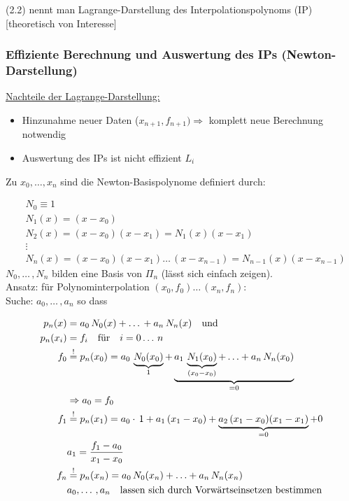 
(2.2) nennt man Lagrange-Darstellung des Interpolationspolynoms (IP) [theoretisch von Interesse]

\subsubsection{Effiziente Berechnung und Auswertung des IPs (Newton-Darstellung)}
\underline{Nachteile der Lagrange-Darstellung:}

\begin{itemize}
	\item Hinzunahme neuer Daten ($x_{n+1},f_{n+1}) \Rightarrow$ komplett neue Berechnung notwendig
	\item Auswertung des IPs ist nicht effizient $L_i$
\end{itemize}

Zu $x_0,\ldots,x_n$ sind die Newton-Basispolynome definiert durch:

\begin{align*}
&N_0 \equiv 1\\
&N_1(x) = (x-x_0)\\
&N_2(x) = (x-x_0)(x-x_1)=N_1(x)(x-x_1)\\
&\vdots \\
&N_n(x) = (x-x_0)(x-x_1)\ldots\,(x-x_{n-1})=N_{n-1}(x)(x-x_{n-1})
\end{align*}
$N_0,\ldots\,,N_n$ bilden eine Basis von $\Pi_n$ (lässt sich einfach zeigen).\\
Ansatz: für Polynominterpolation $(x_0,f_0)\ldots\,(x_n,f_n)$:\\
Suche: $a_0,\ldots\,,a_n$ so dass 

\begin{align*}
p_n(x)&=a_0\,N_0(x) + \ldots\, + a_n\,N_n(x) \quad \text{und} \\
p_n(x_i)&= f_i \quad \text{für} \quad i=0\ldots\,n \\
f_0 &\overset{!}{=} p_n(x_0) = a_0\,\underbrace{N_0(x_0)}_{1} + \underbrace{a_1\,\underbrace{N_1(x_0)}_{(x_0-x_0)} + \ldots + a_n\,N_n(x_0)}_{=0} \\
& \Rightarrow a_0 = f_0 \\
f_1 &\overset{!}{=} p_n(x_1) = a_0\cdot\,1 + a_1\,(x_1-x_0) + \underbrace{a_2\,(x_1-x_0)(x_1-x_1)}_{=0} + 0  \\
& a_1 = \frac{f_1-a_0}{x_1-x_0}\\
f_n &\overset{!}{=} p_n(x_n) = a_0\,N_0(x_n) + \ldots + a_n\,N_n(x_n) \\
& a_0,\ldots\,,a_n \quad \text{lassen sich durch Vorwärtseinsetzen bestimmen}
\end{align*}\\

